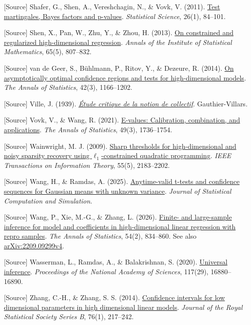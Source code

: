 \documentclass[
  english,
  11pt,
  a4paper,
]{article}
\begin{document}
{[}Source{]} Shafer, G., Shen, A., Vereshchagin, N., \& Vovk, V. (2011).
\href{https://doi.org/10.1214/10-STS347}{Test martingales, Bayes factors
and p-values}. \emph{Statistical Science}, 26(1), 84--101.

{[}Source{]} Shen, X., Pan, W., Zhu, Y., \& Zhou, H. (2013).
\href{https://doi.org/10.1007/s10463-012-0396-3}{On constrained and
regularized high-dimensional regression}. \emph{Annals of the Institute
of Statistical Mathematics}, 65(5), 807--832.

{[}Source{]} van de Geer, S., Bühlmann, P., Ritov, Y., \& Dezeure, R.
(2014). \href{https://doi.org/10.1214/14-AOS1221}{On asymptotically
optimal confidence regions and tests for high-dimensional models}.
\emph{The Annals of Statistics}, 42(3), 1166--1202.

{[}Source{]} Ville, J. (1939).
\href{https://numdam.org/item/THESE_1939__218__1_0/}{\emph{Étude
critique de la notion de collectif}}. Gauthier-Villars.

{[}Source{]} Vovk, V., \& Wang, R. (2021).
\href{https://doi.org/10.1214/20-AOS2020}{E-values: Calibration,
combination, and applications}. \emph{The Annals of Statistics}, 49(3),
1736--1754.

{[}Source{]} Wainwright, M. J. (2009).
\href{https://doi.org/10.1109/TIT.2009.2016018}{Sharp thresholds for
high-dimensional and noisy sparsity recovery using
$\ell_1$-constrained quadratic programming}. \emph{IEEE Transactions
on Information Theory}, 55(5), 2183--2202.

{[}Source{]} Wang, H., \& Ramdas, A. (2025).
\href{https://doi.org/10.1080/07474946.2024.2428245}{Anytime-valid
t-tests and confidence sequences for Gaussian means with unknown
variance}. \emph{Journal of Statistical Computation and Simulation}.

{[}Source{]} Wang, P., Xie, M.-G., \& Zhang, L. (2026).
\href{https://doi.org/10.1214/25-AOS2591}{Finite- and large-sample
inference for model and coefficients in high-dimensional linear
regression with repro samples}. \emph{The Annals of Statistics}, 54(2),
834--860. See also
\href{https://arxiv.org/abs/2209.09299}{arXiv:2209.09299v4}.

{[}Source{]} Wasserman, L., Ramdas, A., \& Balakrishnan, S. (2020).
\href{https://doi.org/10.1073/pnas.1922664117}{Universal inference}.
\emph{Proceedings of the National Academy of Sciences}, 117(29),
16880--16890.

{[}Source{]} Zhang, C.-H., \& Zhang, S. S. (2014).
\href{https://doi.org/10.1111/rssb.12026}{Confidence intervals for low
dimensional parameters in high dimensional linear models}. \emph{Journal
of the Royal Statistical Society Series B}, 76(1), 217--242.
\end{document}

